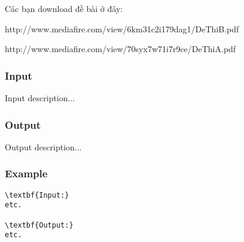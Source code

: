 



   Các bạn download đề bài ở đây:  

   http://www.mediafire.com/view/6km31c2i179dag1/DeThiB.pdf  

   http://www.mediafire.com/view/70syx7w71i7r9ce/DeThiA.pdf  

\subsubsection{   Input  }

   Input description...  

\subsubsection{   Output  }

   Output description...  

\subsubsection{   Example  }
\begin{verbatim}
\textbf{Input:}
etc.

\textbf{Output:}
etc.
\end{verbatim}